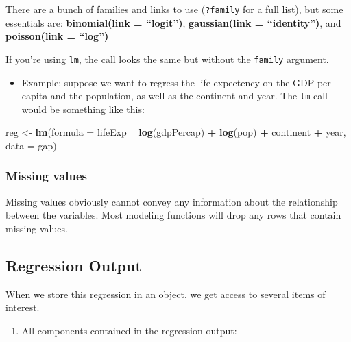 \documentclass[]{book}
\newenvironment{Shaded}{\begin{snugshade}}{\end{snugshade}}
\newcommand{\DataTypeTok}[1]{\textcolor[rgb]{0.13,0.29,0.53}{#1}}
\newcommand{\KeywordTok}[1]{\textcolor[rgb]{0.13,0.29,0.53}{\textbf{#1}}}
\newcommand{\NormalTok}[1]{#1}
\newcommand{\OperatorTok}[1]{\textcolor[rgb]{0.81,0.36,0.00}{\textbf{#1}}}
\newcommand{\StringTok}[1]{\textcolor[rgb]{0.31,0.60,0.02}{#1}}
\providecommand{\tightlist}{%
  \setlength{\itemsep}{0pt}\setlength{\parskip}{0pt}}
\begin{document}
There are a bunch of families and links to use (\texttt{?family} for a full list), but some essentials are: \textbf{binomial(link = ``logit'')}, \textbf{gaussian(link = ``identity'')}, and \textbf{poisson(link = ``log'')}

If you're using \texttt{lm}, the call looks the same but without the \texttt{family} argument.

\begin{itemize}
\tightlist
\item
  Example: suppose we want to regress the life expectency on the GDP per capita and the population, as well as the continent and year. The \texttt{lm} call would be something like this:
\end{itemize}

\begin{Shaded}
\begin{Highlighting}[]
\NormalTok{reg <-}\StringTok{ }\KeywordTok{lm}\NormalTok{(}\DataTypeTok{formula =}\NormalTok{ lifeExp }\OperatorTok{~}\StringTok{ }\KeywordTok{log}\NormalTok{(gdpPercap) }\OperatorTok{+}\StringTok{ }\KeywordTok{log}\NormalTok{(pop) }\OperatorTok{+}\StringTok{ }\NormalTok{continent }\OperatorTok{+}\StringTok{ }\NormalTok{year, }\DataTypeTok{data =}\NormalTok{ gap)}
\end{Highlighting}
\end{Shaded}

\hypertarget{missing-values}{%
\subsubsection*{Missing values}\label{missing-values}}

Missing values obviously cannot convey any information about the relationship between the variables. Most modeling functions will drop any rows that contain missing values.

\hypertarget{regression-output}{%
\subsection{Regression Output}\label{regression-output}}

When we store this regression in an object, we get access to several items of interest.

\begin{enumerate}
\def\labelenumi{\arabic{enumi}.}
\tightlist
\item
  All components contained in the regression output:
\end{enumerate}
\end{document}
